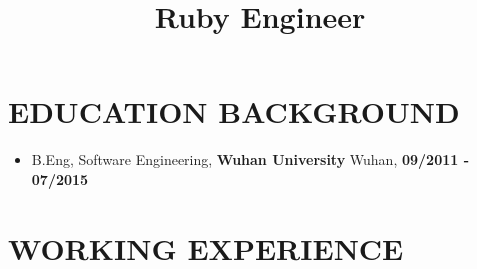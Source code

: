 \documentclass[12pt, a4paper,sans]{moderncv}     %
\title{Ruby Engineer}                 %
\begin{document}
\makecvtitle
\vspace{-30pt}

\section{EDUCATION BACKGROUND}
  \begin{itemize}
    \item{B.Eng, Software Engineering, \textbf{Wuhan University} \hfill Wuhan, \textbf{09/2011 - 07/2015}}
  \end{itemize}


\section{WORKING EXPERIENCE}
\end{document}
